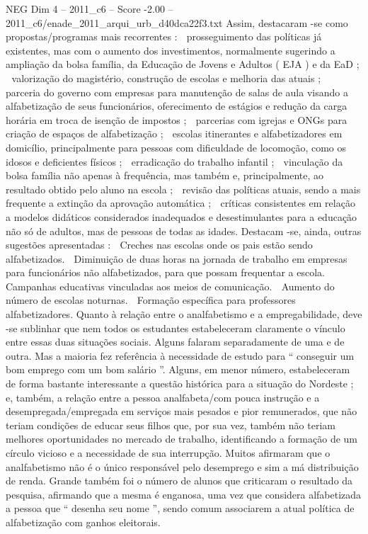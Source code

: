 \begin{textsample}{NEG Dim 4 – 2011\_c6 – Score -2.00 – 2011\_c6/enade\_2011\_arqui\_urb\_d40dca22f3.txt}
Assim, destacaram -se como propostas/programas mais recorrentes :  prosseguimento das políticas já existentes, mas com o aumento dos investimentos, normalmente sugerindo a ampliação da bolsa família, da Educação de Jovens e Adultos ( EJA ) e da EaD ;  valorização do magistério, construção de escolas e melhoria das atuais ;  parceria do governo com empresas para manutenção de salas de aula visando a alfabetização de seus funcionários, oferecimento de estágios e redução da carga horária em troca de isenção de impostos ;  parcerias com igrejas e ONGs para criação de espaços de alfabetização ;  escolas itinerantes e alfabetizadores em domicílio, principalmente para pessoas com dificuldade de locomoção, como os idosos e deficientes físicos ;  erradicação do trabalho infantil ;  vinculação da bolsa família não apenas à frequência, mas também e, principalmente, ao resultado obtido pelo aluno na escola ;  revisão das políticas atuais, sendo a mais frequente a extinção da aprovação automática ;  críticas consistentes em relação a modelos didáticos considerados inadequados e desestimulantes para a educação não só de adultos, mas de pessoas de todas as idades.
Destacam -se, ainda, outras sugestões apresentadas :  Creches nas escolas onde os pais estão sendo alfabetizados.  Diminuição de duas horas na jornada de trabalho em empresas para funcionários não alfabetizados, para que possam frequentar a escola.  Campanhas educativas vinculadas aos meios de comunicação.  Aumento do número de escolas noturnas.  Formação específica para professores alfabetizadores.
Quanto à relação entre o analfabetismo e a empregabilidade, deve -se sublinhar que nem todos os estudantes estabeleceram claramente o vínculo entre essas duas situações sociais.
Alguns falaram separadamente de uma e de outra.
Mas a maioria fez referência à necessidade de estudo para “ conseguir um bom emprego com um bom salário ”.
Alguns, em menor número, estabeleceram de forma bastante interessante a questão histórica para a situação do Nordeste ; e, também, a relação entre a pessoa analfabeta/com pouca instrução e a desempregada/empregada em serviços mais pesados e pior remunerados, que não teriam condições de educar seus filhos que, por sua vez, também não teriam melhores oportunidades no mercado de trabalho, identificando a formação de um círculo vicioso e a necessidade de sua interrupção.
Muitos afirmaram que o analfabetismo não é o único responsável pelo desemprego e sim a má distribuição de renda.
Grande também foi o número de alunos que criticaram o resultado da pesquisa, afirmando que a mesma é enganosa, uma vez que considera alfabetizada a pessoa que “ desenha seu nome ”, sendo comum associarem a atual política de alfabetização com ganhos eleitorais.

\end{textsample}
